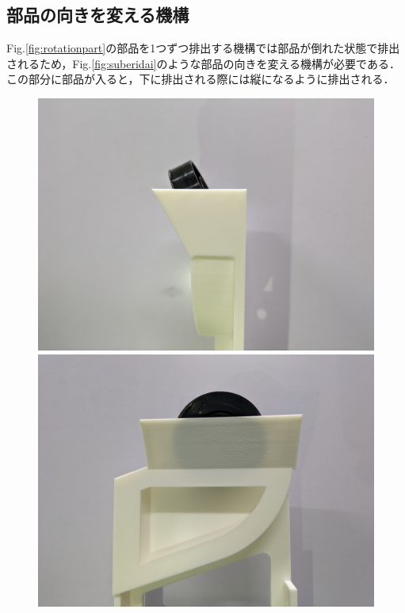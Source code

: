 \documentclass{classes/resume}
\begin{document}
\subsection{部品の向きを変える機構}
    Fig.\ref{fig:rotationpart}の部品を1つずつ排出する機構では部品が倒れた状態で排出されるため，Fig.\ref{fig:suberidai}のような部品の向きを変える機構が必要である．この部分に部品が入ると，下に排出される際には縦になるように排出される．
    \begin{figure}[tbp]
        \centering
        \begin{minipage}[t]{0.3\linewidth}
            \centering
            \includegraphics[width=0.9\linewidth]{figures/mukikae_yoko.jpg}
        \end{minipage}
        \begin{minipage}[t]{0.3\linewidth}
            \centering
            \includegraphics[width=0.9\linewidth]{figures/mukike_syoumen.jpg}

\end{minipage}
\end{figure}
\end{document}
